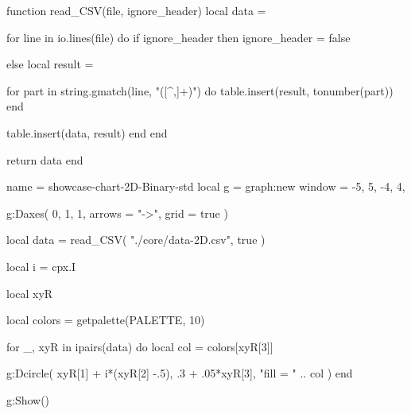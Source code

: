 \documentclass{tutodoc}
\newcommand{\PALETTE}{Binary}
\begin{document}

\vfill

\begin{luacode*}
function read_CSV(file, ignore_header)
  local data = {}

  for line in io.lines(file) do
    if ignore_header then
      ignore_header = false

    else
      local result = {}
      
      for part in string.gmatch(line, "([^,]+)") do
        table.insert(result, tonumber(part))
      end
      
      table.insert(data, result)
    end
  end

  return data
end
\end{luacode*}


\begin{luadraw}{name = showcase-chart-2D-\PALETTE-std}
local g = graph:new{
  window = {-5, 5, -4, 4},
}

g:Daxes(
  {0, 1, 1},
  {
    arrows = "->", 
    grid   = true
  }
)

local data = read_CSV(
  "./core/data-2D.csv",
  true
)

local i = cpx.I

local xyR
 
local colors = getpalette(PALETTE, 10)
 
for _, xyR in ipairs(data) do
  local col = colors[xyR[3]]

  g:Dcircle(
    xyR[1] + i*(xyR[2] -.5), .3 + .05*xyR[3],
    "fill = " .. col
  )
end

g:Show()
\end{luadraw}
\end{document}
